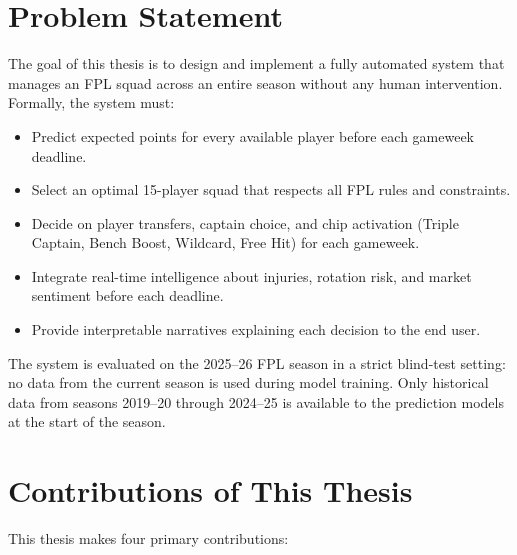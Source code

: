 \section{Problem Statement}

The goal of this thesis is to design and implement a fully automated system that manages an FPL squad across an entire season without any human intervention. Formally, the system must:

\begin{itemize}
  \item Predict expected points for every available player before each gameweek deadline.
  \item Select an optimal 15-player squad that respects all FPL rules and constraints.
  \item Decide on player transfers, captain choice, and chip activation (Triple Captain, Bench Boost, Wildcard, Free Hit) for each gameweek.
  \item Integrate real-time intelligence about injuries, rotation risk, and market sentiment before each deadline.
  \item Provide interpretable narratives explaining each decision to the end user.
\end{itemize}

The system is evaluated on the 2025--26 FPL season in a strict blind-test setting: no data from the current season is used during model training. Only historical data from seasons 2019--20 through 2024--25 is available to the prediction models at the start of the season.

\section{Contributions of This Thesis}

This thesis makes four primary contributions:

